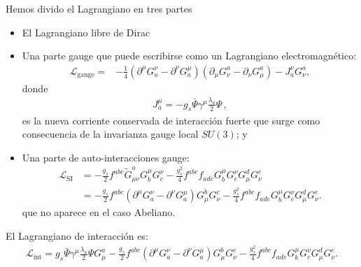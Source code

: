 \begin{frame}
Hemos divido el Lagrangiano en tres partes
\begin{itemize}
\item El Lagrangiano libre de Dirac
\item Una parte gauge que puede escribirse como un Lagrangiano electromagnético:
\begin{align}
  \mathcal{L}_{\text{gauge}}=&-\frac{1}{4}\left(\partial^\mu G^\nu_a-\partial^\nu G^\mu_a\right)\left(\partial_\mu G_\nu^a-\partial_\nu G_\mu^a\right)-J^\nu_aG_\nu^a,
\end{align}
donde
\begin{align}
  J^\mu_a=-g_s\bar{\Psi}\gamma^\mu\frac{\lambda_a}{2}\Psi\,,
\end{align}
es la nueva corriente conservada de interacción fuerte que surge como consecuencia de la invarianza gauge local $SU(3)$; y 
\item Una parte de auto-interacciones gauge:
  \begin{align}
    \mathcal{L}_{\text{SI}}  &=- \frac{g_s}{2}f^{a b c}\widetilde{G}_{\mu\nu}^aG_b^\mu G_c^\nu
    -\frac{g_s^2}{4}f^{a b c}f_{a d e}G_b^\mu G_c^\nu G^d_\mu G^e_\nu\nonumber\\
  &=-\frac{g_s}{2}f^{abc}\left(\partial^\mu G^\nu_a-\partial^\nu G^\mu_a\right)G^b_\mu G^c_\nu-\frac{g_s^2}{4}f^{abc}f_{ade}G^\mu_bG^\nu_cG^d_\mu G^e_\nu.
  \end{align}
que no aparece en el caso Abeliano.
\end{itemize}

El Lagrangiano de interacción es:
\begin{align}
  \mathcal{L}_{\text{int}}=g_s\bar{\Psi}\gamma^\mu\frac{\lambda_a}{2}\Psi G_\mu^a-\frac{g_s}{2}f^{abc}\left(\partial^\mu G^\nu_a-\partial^\nu G^\mu_a\right)G^b_\mu G^c_\nu-\frac{g_s^2}{4}f^{abc}f_{ade}G^\mu_bG^\nu_cG^d_\mu G^e_\nu.
\end{align}

\end{frame}


